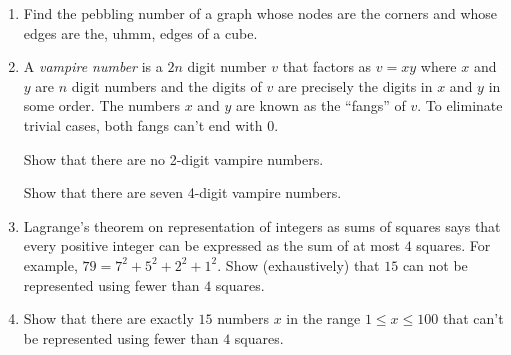 \begin{enumerate}
\wbvfill

\workbookpagebreak

\item Find the pebbling number of a graph whose nodes are the corners and 
whose edges are the, uhmm, edges of a cube.


\wbvfill

\item A \emph{vampire number} is a $2n$ digit number $v$ that factors as $v=xy$
where $x$ and $y$ are $n$ digit numbers and the digits of $v$ are precisely the digits in $x$ and $y$ in some order.  The numbers $x$ and $y$
are known as the ``fangs'' of $v$.  To eliminate trivial
cases, both fangs can't end with 0.  

Show that there are no 2-digit vampire numbers.

Show that there are seven 4-digit vampire numbers.


\wbvfill

\workbookpagebreak

\item Lagrange's theorem on representation of integers as sums of squares
says that every positive integer can be expressed as the sum of at most 
$4$ squares.  For example, $79 = 7^2 + 5^2 + 2^2 + 1^2$.  Show (exhaustively) 
that $15$ can not be represented using fewer than $4$ squares.


\wbvfill

\item Show that there are exactly $15$ numbers $x$ in the range $1 \leq x \leq 100$ that can't be represented using fewer than $4$ squares.



\end{enumerate}
